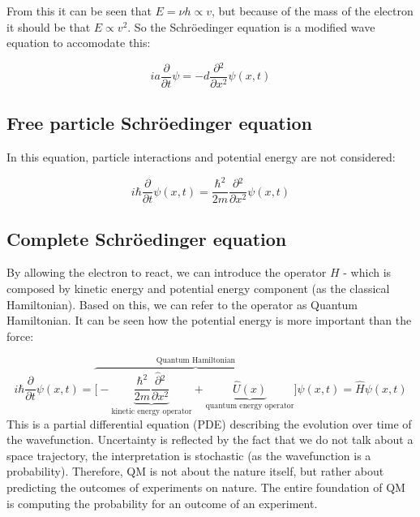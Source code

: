 \noindent
From this it can be seen that $E=\nu h\propto v$, but because of the mass of the electron it should be that $E\propto v^2$.
So the Schr\"oedinger equation is a modified wave equation to accomodate this:

$$ia \frac{\partial {}}{\partial {t}}\psi=-d \frac{\partial {^2}}{\partial {x^2}}\psi(x,t)$$

  \subsection{Free particle Schr\"oedinger equation}
  In this equation, particle interactions and potential energy are not considered:

  $$i\hbar \frac{\partial {}}{\partial {t}}\psi(x,t) = \frac{\hbar^2}{2m}\frac{\partial {^2}}{\partial {x^2}}\psi(x,t)$$

  \subsection{Complete Schr\"oedinger equation}
  By allowing the electron to react, we can introduce the operator $H$ - which is composed by kinetic energy and potential energy component (as the classical Hamiltonian). Based on this, we can refer to the operator as Quantum Hamiltonian.
  It can be seen how the potential energy is more important than the force:

  $$i\hbar \frac{\partial {}}{\partial {t}}\psi(x,t) = \overbrace{\biggl[-\underbrace{\frac{\hbar^2}{2m}\frac{\hat{\partial} {^2}}{\partial {x^2}}}_{\text{kinetic energy operator}}+\underbrace{\hat{U}(x)}_{\text{quantum energy operator}}\biggr]}^{\text{Quantum Hamiltonian}}\psi(x,t) = \hat{H}\psi(x,t)$$
  This is a partial differential equation (PDE) describing the evolution over time of the wavefunction. Uncertainty is reflected by the fact that we do not talk about a space trajectory, the interpretation is stochastic (as the wavefunction is a probability). Therefore, QM is not about the nature itself, but rather about predicting the outcomes of experiments on nature. The entire foundation of QM is computing the probability for an outcome of an experiment. 
